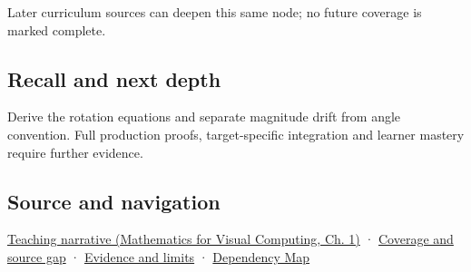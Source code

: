 \hypertarget{appendix-f77eadcc4a93-used-by}{}

Later curriculum sources can deepen this same node; no future coverage is marked complete.

\subsection{Recall and next depth}\label{appendix-f77eadcc4a93-recall-and-next-depth}

\hypertarget{appendix-f77eadcc4a93-recall-and-next-depth}{}

Derive the rotation equations and separate magnitude drift from angle convention. Full production proofs, target-specific integration and learner mastery require further evidence.

\subsection{Source and navigation}\label{appendix-f77eadcc4a93-source-and-navigation}

\hypertarget{appendix-f77eadcc4a93-source-and-navigation}{}

\href{../02-Mathematics-for-Visual-Computing/main.pdf\#nameddest=01-foundations-i-ch017-rotation-first-becomes-understandable-in-a-plane}{Teaching narrative (Mathematics for Visual Computing, Ch. 1)} · \hyperref[appendix-fd090d982a15-phase-6---parts-501-600]{Coverage and source gap} · \hyperref[appendix-a103e7846d21-phase-6---source-analysis-and-verification]{Evidence and limits} · \hyperref[appendix-4ad47bdd269a]{Dependency Map}

